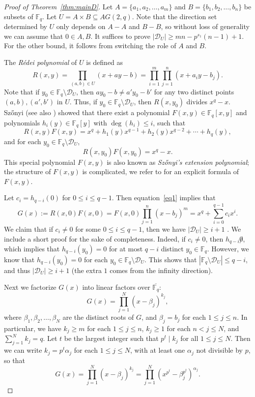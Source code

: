 \documentclass[12pt,reqno]{amsart}
\theoremstyle{definition}
\newcommand{\F}{\mathbb{F}}
\begin{document}
\begin{proof}[Proof of Theorem~\ref{thm:mainD}]
Let $A=\{a_1,a_2, \ldots,a_m\}$ and $B=\{b_1, b_2, \ldots, b_n\}$ be subsets of $\F_q$. Let $U=A \times B \subseteq AG(2,q)$. Note that the direction set determined by $U$ only depends on $A-A$ and $B-B$, so without loss of generality we can assume that $0 \in A, B$. It suffices to prove $|\mathcal{D}_U| \geq mn-p^{s_1}(n-1)+1$. For the other bound, it follows from switching the role of $A$ and $B$. 

The \emph{R\'edei polynomial} \cite{LR73} of $U$ is defined as 
$$ R(x,y) = \prod_{(a,b)\in U} (x+ay-b)=\prod_{i=1}^m \prod_{j=1}^n (x+a_iy-b_j) .$$
Note that if $y_0 \in \F_q \setminus \mathcal{D}_U$, then $ay_0-b \neq a'y_0-b'$ for any two distinct points $(a,b), (a',b')$ in $U$. Thus, if $y_0 \in \F_q \setminus \mathcal{D}_U$, then $R(x,y_0)$ divides $x^q-x$. Sz\H{o}nyi \cite{S96, S99} (see also \cite{DSW,Yip2}) showed that there exist a polynomial $F(x,y) \in \F_q[x,y]$ and polynomials $h_i(y) \in \F_q[y]$ with $\operatorname{deg} (h_i) \leq i$, such that 
\begin{equation}\label{eq1}
 R(x,y)F(x,y) = x^q + h_1(y)x^{q-1} + h_2(y)x^{q-2} + \cdots + h_q(y),
\end{equation}
and for each $y_0 \in \F_q \setminus \mathcal{D}_U$,
$$
R(x,y_0)F(x,y_0)=x^q-x.
$$
This special polynomial $F(x,y)$ is also known as \emph{Sz\H{o}nyi's extension polynomial}; the structure of $F(x,y)$ is complicated, we refer to \cite[Section 2.2]{Yip2} for an explicit formula of $F(x,y)$.

Let $c_i=h_{q-i}(0)$ for $0 \leq i \leq q-1$. Then equation~\eqref{eq1} implies that
\begin{equation} \label{eq2}
 G(x):=R(x,0)F(x,0) = F(x,0)\prod_{j=1}^n (x-b_j)^m =x^q+\sum_{i=0}^{q-1} c_ix^i.
\end{equation}
We claim that if $c_i \neq 0$ for some $0 \leq i \leq q-1$, then we have $|\mathcal{D}_U|\geq i+1$ \cite{LR73, S99}. We include a short proof for the sake of completeness.  Indeed, if $c_i \neq 0$, then $h_{q-i} \not 0$, which implies that $h_{q-i}(y_0)=0$ for at most $q-i$ distinct $y_0 \in \F_q$. However, we know that $h_{q-i}(y_0)=0$ for each $y_0 \in \F_q \setminus \mathcal{D}_U$. This shows that $|\F_q \setminus \mathcal{D}_U|\leq q-i$, and thus $|\mathcal{D}_U| \geq i+1$ (the extra $1$ comes from the infinity direction). 

Next we factorize $G(x)$ into linear factors over $\overline{\F_q}$: 
$$
G(x)=\prod_{j=1}^N (x-\beta_j)^{k_j},
$$
where $\beta_1, \beta_2, \ldots, \beta_N$ are the distinct roots of $G$, and $\beta_j=b_j$ for each $1 \leq j \leq n$. In particular, we have $k_j \geq m$ for each $1 \leq j \leq n$, $k_j \geq 1$ for each $n<j \leq N$, and $\sum_{j=1}^N k_j=q$. Let $t$ be the largest integer such that $p^t \mid k_j$ for all $1 \leq j \leq N$. Then we can write $k_j=p^t \alpha_j$ for each $1 \leq j \leq N$, with at least one $\alpha_j$ not divisible by $p$, so that
$$
G(x)=\prod_{j=1}^N (x-\beta_j)^{k_j}=\prod_{j=1}^N (x^{p^t}-\beta_j^{p^t})^{\alpha_j}.
$$


\end{proof}
\end{document}

